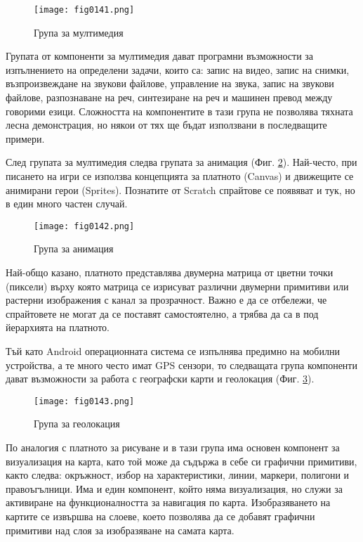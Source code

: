 \begin{figure}[H]
  \centering
  \texttt{[image: fig0141.png]}
  \caption{Група за мултимедия}
\label{fig0141}
\end{figure}

Групата от компоненти за мултимедия дават програмни възможности за изпълнението на определени задачи, които са: запис на видео, запис на снимки, възпроизвеждане на звукови файлове, управление на звука, запис на звукови файлове, разпознаване на реч, синтезиране на реч и машинен превод между говорими езици. Сложността на компонентите в тази група не позволява тяхната лесна демонстрация, но някои от тях ще бъдат използвани в последващите примери. 

След групата за мултимедия следва групата за анимация (Фиг. \ref{fig0142}). Най-често, при писането на игри се използва концепцията за платното (Canvas) и движещите се анимирани герои (Sprites). Познатите от Scratch спрайтове се появяват и тук, но в един много частен случай. 

\begin{figure}[H]
  \centering
  \texttt{[image: fig0142.png]}
  \caption{Група за анимация}
\label{fig0142}
\end{figure}

Най-общо казано, платното представлява двумерна матрица от цветни точки (пиксели) върху която матрица се изрисуват различни двумерни примитиви или растерни изображения с канал за прозрачност. Важно е да се отбележи, че спрайтовете не могат да се поставят самостоятелно, а трябва да са в под йерархията на платното. 

Тъй като Android операционната система се изпълнява предимно на мобилни устройства, а те много често имат GPS сензори, то следващата група компоненти дават възможности за работа с географски карти и геолокация (Фиг. \ref{fig0143}). 

\begin{figure}[H]
  \centering
  \texttt{[image: fig0143.png]}
  \caption{Група за геолокация}
\label{fig0143}
\end{figure}

По аналогия с платното за рисуване и в тази група има основен компонент за визуализация на карта, като той може да съдържа в себе си графични примитиви, както следва: окръжност, избор на характеристики, линии, маркери, полигони и правоъгълници. Има и един компонент, който няма визуализация, но служи за активиране на функционалността за навигация по карта. Изобразяването на картите се извършва на слоеве, което позволява да се добавят графични примитиви над слоя за изобразяване на самата карта. 

